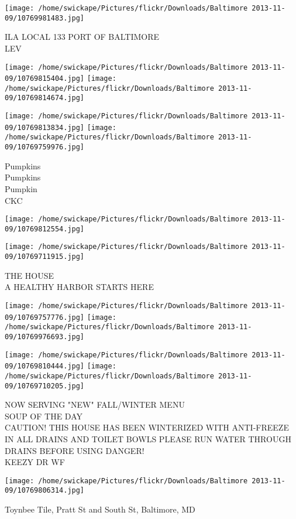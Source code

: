 \documentclass[10pt,letterpaper]{article}
\begin{document}
\vspace{0.25in}
\texttt{[image: /home/swickape/Pictures/flickr/Downloads/Baltimore 2013-11-09/10769981483.jpg]}

ILA LOCAL 133 PORT OF BALTIMORE\\
LEV
\pagebreak

\texttt{[image: /home/swickape/Pictures/flickr/Downloads/Baltimore 2013-11-09/10769815404.jpg]}
\texttt{[image: /home/swickape/Pictures/flickr/Downloads/Baltimore 2013-11-09/10769814674.jpg]}

\texttt{[image: /home/swickape/Pictures/flickr/Downloads/Baltimore 2013-11-09/10769813834.jpg]}
\texttt{[image: /home/swickape/Pictures/flickr/Downloads/Baltimore 2013-11-09/10769759976.jpg]}

Pumpkins\\
Pumpkins\\
Pumpkin\\
CKC
\pagebreak

\texttt{[image: /home/swickape/Pictures/flickr/Downloads/Baltimore 2013-11-09/10769812554.jpg]}

\vspace{0.25in}
\texttt{[image: /home/swickape/Pictures/flickr/Downloads/Baltimore 2013-11-09/10769711915.jpg]}

THE HOUSE\\
A HEALTHY HARBOR STARTS HERE
\pagebreak

\texttt{[image: /home/swickape/Pictures/flickr/Downloads/Baltimore 2013-11-09/10769757776.jpg]}
\texttt{[image: /home/swickape/Pictures/flickr/Downloads/Baltimore 2013-11-09/10769976693.jpg]}

\texttt{[image: /home/swickape/Pictures/flickr/Downloads/Baltimore 2013-11-09/10769810444.jpg]}
\texttt{[image: /home/swickape/Pictures/flickr/Downloads/Baltimore 2013-11-09/10769710205.jpg]}

NOW SERVING "NEW" FALL/WINTER MENU\\
SOUP OF THE DAY\\
CAUTION! THIS HOUSE HAS BEEN WINTERIZED WITH ANTI{-}FREEZE IN ALL DRAINS AND TOILET BOWLS PLEASE RUN WATER THROUGH DRAINS BEFORE USING DANGER!\\
KEEZY DR WF
\pagebreak

\texttt{[image: /home/swickape/Pictures/flickr/Downloads/Baltimore 2013-11-09/10769806314.jpg]}

Toynbee Tile, Pratt St and South St, Baltimore, MD
\pagebreak
\end{document}

